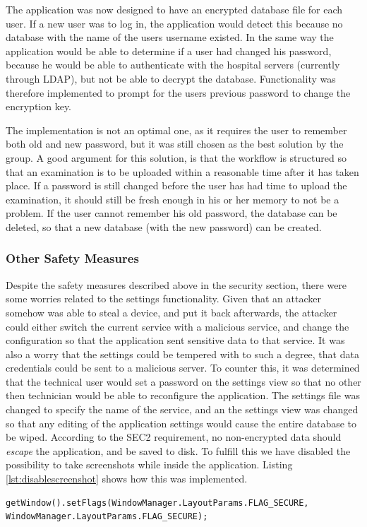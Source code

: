 The application was now designed to have an encrypted database file for each user. If a new user was to log in, the application would detect this because no database with the name of the users username existed. In the same way the application would be able to determine if a user had changed his password, because he would be able to authenticate with the hospital servers (currently through LDAP), but not be able to decrypt the database. Functionality was therefore implemented to prompt for the users previous password to change the encryption key.

The implementation is not an optimal one, as it requires the user to remember both old and new password, but it was still chosen as the best solution by the group. A good argument for this solution, is that the workflow is structured so that an examination is to be uploaded within a reasonable time after it has taken place. If a password is still changed before the user has had time to upload the examination, it should still be fresh enough in his or her memory to not be a problem. If the user cannot remember his old password, the database can be deleted, so that a new database (with the new password) can be created. 


\subsubsection{Other Safety Measures}
Despite the safety measures described above in the security section, there were some worries related to the settings functionality. Given that an attacker somehow was able to steal a device, and put it back afterwards, the attacker could either switch the current service with a malicious service, and change the configuration so that the application sent sensitive data to that service. It was also a worry that the settings could be tempered with to such a degree, that data credentials could be sent to a malicious server. 
To counter this, it was determined that the technical user would set a password on the settings view so that no other then technician would be able to reconfigure the application. The settings file was changed to specify the name of the service, and an the settings view was changed so that any editing of the application settings would cause the entire database to be wiped.
According to the SEC2 requirement, no non-encrypted data should \emph{escape} the application, and be saved to disk. To fulfill this we have disabled the possibility to take screenshots while inside the application. Listing \ref{lst:disablescreenshot} shows how this was implemented.
\newpage
\begin{lstlisting}[caption={Screenshot disabling}, label={lst:disablescreenshot}]
getWindow().setFlags(WindowManager.LayoutParams.FLAG_SECURE, WindowManager.LayoutParams.FLAG_SECURE);
\end{lstlisting}




